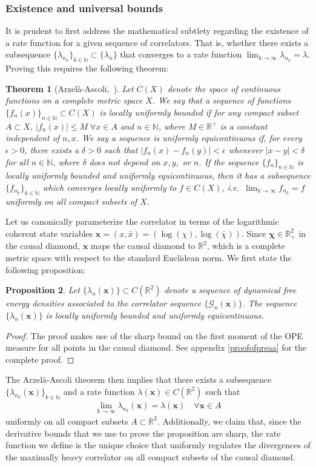 \documentclass[a4paper,11pt]{article}
\theoremstyle{plain}
\newtheorem{thm}{Theorem}[section]
\newtheorem{prop}[thm]{Proposition}
\theoremstyle{definition}
\theoremstyle{remark}
\newcommand{\bs}[1]{\boldsymbol{#1}}
\newcommand{\ba}{\begin{equation} \begin{aligned}}
\newcommand{\ea}{\end{aligned} \end{equation}}
\begin{document}
\subsubsection{Existence and universal bounds}
It is prudent to first address the mathematical subtlety regarding the existence of a rate function for a given sequence of correlators. That is, whether there exists a subsequence $\{\lambda_{n_{k}}\}_{k\in\mathbb{N}} \subset\{\lambda_n\}$ that converges to a rate function $\lim_{k\to \infty} \lambda_{n_k} = \lambda$. Proving this requires the following theorem:
\begin{thm}[Arzel\`a-Ascoli,~\cite{Munkres2000}] 
\label{aathm}
Let $C(X)$ denote the space of continuous functions on a complete metric space $X$. We say that a sequence of functions $\{f_n(x)\}_{n\in\mathbb{N}} \subset C(X)$ is locally uniformly bounded if for any compact subset $A \subset X$, $|f_n(x)| \leq M \; \forall x \in A$ and $n \in\mathbb{N}$, where $M \in\mathbb{R}^+$ is a constant independent of $n,x$. We say a sequence is uniformly equicontinuous if, for every $\epsilon > 0$, there exists a $\delta > 0$ such that $|f_n(x) - f_n(y)| < \epsilon$ whenever $|x-y| < \delta$ for all $n\in\mathbb{N}$, where $\delta$ does not depend on $x,y,$ or $n$. If the sequence $\{f_n\}_{n\in\mathbb{N}}$ is locally uniformly bounded and uniformly equicontinuous, then it has a subsequence $\{f_{n_k}\}_{k\in \mathbb{N}}$ which converges locally uniformly to $f \in C(X)$, i.e.~$\lim_{k\to\infty}f_{n_k} = f $ uniformly on all compact subsets of $X$. 
\end{thm}
Let us canonically parameterize the correlator in terms of the logarithmic coherent state variables $\bs{x} = (x,\bar{x}) = ( \log(\chi),\log(\bar{\chi}))$. Since $\bs{\chi} \in \mathbb{R}^2_+$ in the causal diamond, $\bs{x}$ maps the causal diamond to $\mathbb{R}^2$, which is a complete metric space with respect to the standard Euclidean norm. We first state the following proposition:
\begin{prop}
\label{preaa}
Let $\{\lambda_n(\bs{x})\} \subset C(\mathbb{R}^2)$ denote a sequence of dynamical free energy densities associated to the correlator sequence $\{\mathcal{G}_n(\bs{x})\}$. The sequence $\{\lambda_n(\bs{x})\}$ is locally uniformly bounded and uniformly equicontinuous. 
\end{prop}
\begin{proof}
The proof makes use of the sharp bound on the first moment of the OPE measure for all points in the causal diamond. See appendix \ref{proofofpreaa}  for the complete proof. 
\end{proof}
The Arzel\`a-Ascoli theorem then implies that there exists a subsequence $\{\lambda_{n_k}(\bs{x})\}_{k\in\mathbb{N}}$ and a rate function $\lambda(\bs{x}) \in C(\mathbb{R}^2)$ such that
\ba
\lim_{k\to \infty} \lambda_{n_k}(\bs{x}) = \lambda(\bs{x}) \quad \forall \bs{x} \in A
\ea
uniformly on all compact subsets $A\subset \mathbb{R}^2$. Additionally, we claim that, since the derivative bounds that we use to prove the proposition are sharp, the rate function we define is the unique choice that uniformly regulates the divergences of the maximally heavy correlator on all compact subsets of the causal diamond.
\end{document}
